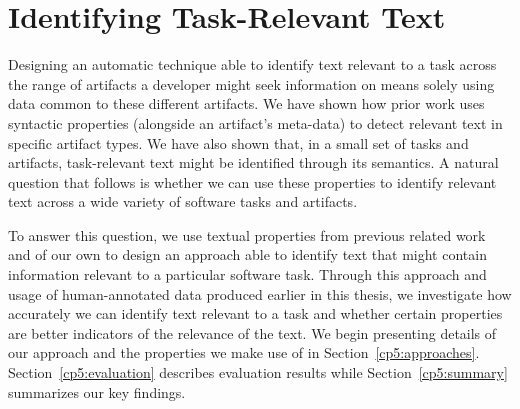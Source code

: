 \setcounter{chapter}{4}
\setcounter{rq}{1}


\chapter{Identifying Task-Relevant Text}
\label{ch:identifying}



Designing an automatic technique able to identify text relevant to a task across the range of artifacts a developer might seek information on means solely using data common to these different artifacts.
We have shown how  prior work uses syntactic properties (alongside an artifact's meta-data)
to detect relevant text in specific artifact types.
We have also shown that, in a small set of tasks and artifacts, task-relevant text might be identified through its semantics.
A natural question that follows is whether we can use these properties to identify relevant text across a wide variety of software tasks and artifacts.




To answer this question, we use textual properties from previous related work and of our own 
to design an approach able to identify text that might contain information relevant to a particular software task.
Through this approach and usage of human-annotated data produced earlier in this thesis, we 
investigate how accurately we can identify text relevant to a task and whether certain properties are better indicators of the relevance of the text.
We begin presenting details of our approach and the properties we make use of in Section~\ref{cp5:approaches}.
Section~\ref{cp5:evaluation} describes evaluation results while
Section~\ref{cp5:summary} summarizes our key findings.







